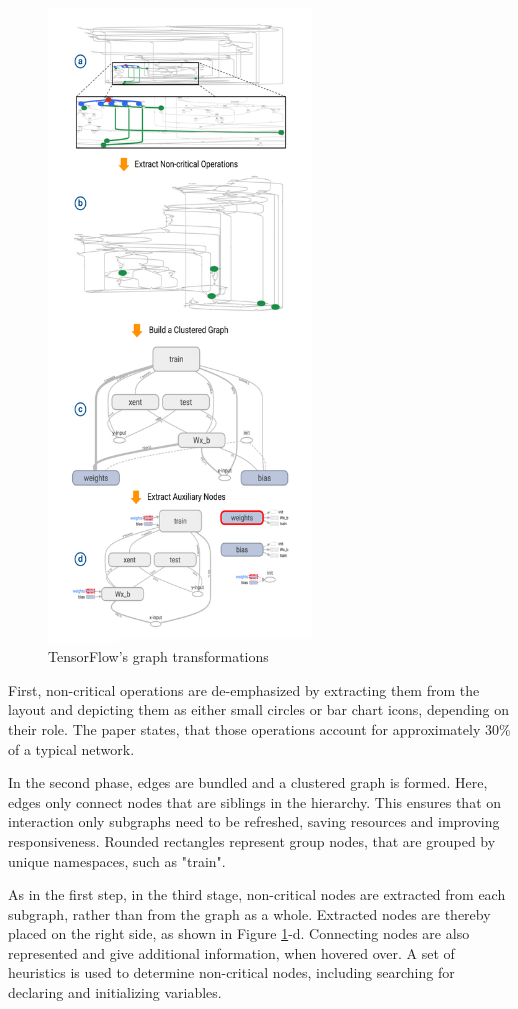 \documentclass{acmsiggraph}               %
\begin{document}
\begin{figure}[!htb]
\includegraphics[width=2.75in]{transformations_Wongsuphasawat_et_al}
\caption{TensorFlow's graph transformations \protect\cite{Wongsuphasawat2018}}
\label{fig:transformations}
\end{figure}

First, non-critical operations are de-emphasized by extracting them from the layout and depicting them as either small circles or bar chart icons, depending on their role. The paper states, that those operations account for approximately 30\% of a typical network.

In the second phase, edges are bundled and a clustered graph is formed. Here, edges only connect nodes that are siblings in the hierarchy. This ensures that on interaction only subgraphs need to be refreshed, saving resources and improving responsiveness. Rounded rectangles represent group nodes, that are grouped by unique namespaces, such as "train".

As in the first step, in the third stage, non-critical nodes are extracted from each subgraph, rather than from the graph as a whole. Extracted nodes are thereby placed on the right side, as shown in Figure \ref{fig:transformations}-d. Connecting nodes are also represented and give additional information, when hovered over. A set of heuristics is used to determine non-critical nodes, including searching for declaring and initializing variables.
\end{document}
